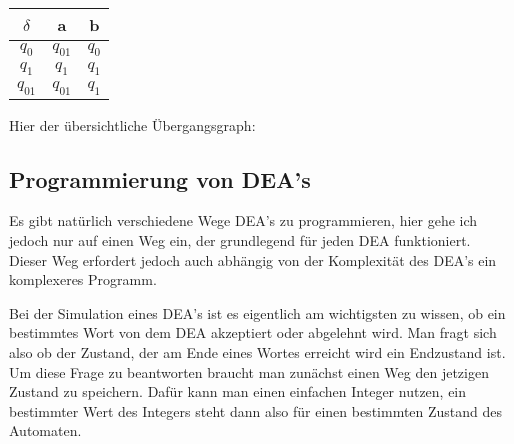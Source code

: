 \begin{center}
\begin{tabular}{|c|c|c|}
    \hline
    $\delta$ & a & b \\
    \hline
    $q_0$ & $q_{01}$ & $q_0$ \\
    \hline
    $q_1$ & $q_1$ & $q_1$ \\
    \hline
    $q_{01}$ & $q_{01}$ & $q_1$ \\
    \hline
\end{tabular}
\end{center}

\begin{flushleft}   
Hier der übersichtliche Übergangsgraph:
\end{flushleft}

\begin{center}
\end{center}

\subsection{Programmierung von DEA's}
\begin{flushleft}
Es gibt natürlich verschiedene Wege DEA's zu programmieren,
hier gehe ich jedoch nur auf einen Weg ein, der grundlegend
für jeden DEA funktioniert.
Dieser Weg erfordert jedoch auch abhängig von der Komplexität des DEA's
ein komplexeres Programm.
\end{flushleft}

\begin{flushleft}
Bei der Simulation eines DEA's ist es eigentlich am
wichtigsten zu wissen, ob ein bestimmtes Wort von dem DEA akzeptiert oder
abgelehnt wird.
Man fragt sich also ob der Zustand, der am Ende eines Wortes erreicht
wird ein Endzustand ist.
Um diese Frage zu beantworten braucht man zunächst einen Weg den jetzigen
Zustand zu speichern.
Dafür kann man einen einfachen Integer nutzen, ein bestimmter Wert des Integers
steht dann also für einen bestimmten Zustand des Automaten.
\end{flushleft}

